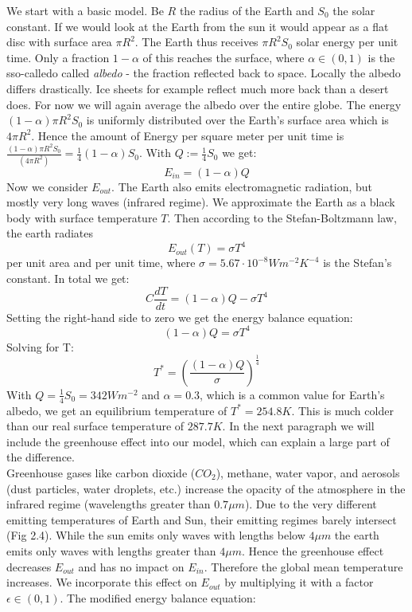 \documentclass[%
thesis=student,%
coverpage=false,%
titlepage=false,%
headmarks=true, %
english,%
font=libertine, %
math=newpxtx, %
BCOR=5mm,%
coverBCOR=11mm%
]{tumbook}
\begin{document}
We start with a basic model.
Be $R$ the radius of the Earth and $S_{0}$ the solar constant. If we would look at the Earth from the sun it would appear as a flat disc with surface area $\pi R^2$. The Earth thus receives $\pi R^2 S_{0}$ solar energy per unit time. Only a fraction $1-\alpha$ of this reaches the surface, where $\alpha \in (0,1)$ is the sso-calledo called \textit{albedo} - the fraction reflected back to space. Locally the albedo differs drastically. Ice sheets for example reflect much more back than a desert does. For now we will again average the albedo over the entire globe. The energy $(1-\alpha)\pi R^2S_{0}$ is uniformly distributed over the Earth's surface area which is $4\pi R^2$. Hence the amount of Energy per square meter per unit time is $\frac{(1-\alpha)\pi R^2S_{0}}{(4\pi R^2)} = \frac{1}{4}(1-\alpha)S_{0}$. With $Q:=\frac{1}{4}S_{0}$ we get: 
\begin{equation}
    E_{in} = (1-\alpha)Q
\end{equation}
Now we consider $E_{out}$. The Earth also emits electromagnetic radiation, but mostly very long waves (infrared regime). We approximate the Earth as a black body with surface temperature $T$. Then according to the Stefan-Boltzmann law, the earth radiates 
\begin{equation}
    E_{out}(T) = \sigma T^4
\end{equation}
per unit area and per unit time, where $\sigma = 5.67 \cdot 10^{-8}Wm^{-2}K^{-4}$ is the Stefan's constant. In total we get: 
\begin{equation}
    C\frac{dT}{dt} = (1-\alpha)Q - \sigma T^4
\end{equation}
Setting the right-hand side to zero we get the energy balance equation: 
\begin{equation}
    (1-\alpha)Q = \sigma T^4
\end{equation}
Solving for T: 
\begin{equation}
    T^* = (\frac{(1-\alpha)Q}{\sigma})^\frac{1}{4}
\end{equation}
With $Q = \frac{1}{4}S_{0}= 342 Wm^{-2}$ and $\alpha = 0.3$, which is a common value for Earth's albedo, we get an equilibrium temperature of $T^* = 254.8K$. This is much colder than our real surface temperature of $287.7K$. In the next paragraph we will include the greenhouse effect into our model, which can explain a large part of the difference.
\\ 
Greenhouse gases like carbon dioxide ($CO_{2}$), methane, water vapor, and aerosols (dust particles, water droplets, etc.) increase the opacity of the atmosphere in the infrared regime (wavelengths greater than $0.7 \mu m$). Due to the very different emitting temperatures of Earth and Sun, their emitting regimes barely intersect (Fig 2.4). While the sun emits only waves with lengths below $4 \mu m$ the earth emits only waves with lengths greater than $4 \mu m$. Hence the greenhouse effect decreases $E_{out}$ and has no impact on $E_{in}$. Therefore the global mean temperature increases. We incorporate this effect on $E_{out}$ by multiplying it with a factor $\epsilon \in (0,1)$. The modified energy balance equation: 
\end{document}

